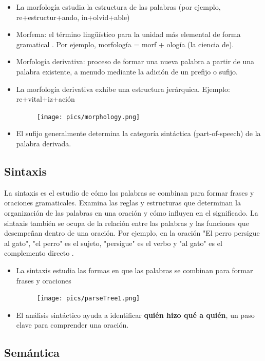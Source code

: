\documentclass{book}
\begin{document}
\begin{itemize}
\item La morfología estudia la estructura de las palabras (por ejemplo, re+estructur+ando, in+olvid+able) \cite{JohnsonMLSS}
\item Morfema: el término lingüístico para la unidad más elemental de forma gramatical \cite{fromkin2018introduction}. Por ejemplo, morfología = morf + ología (la ciencia de).
\item Morfología derivativa: proceso de formar una nueva palabra a partir de una palabra existente, a menudo mediante la adición de un prefijo o sufijo.
\item La morfología derivativa exhibe una estructura jerárquica. Ejemplo: re+vital+iz+ación
\begin{figure}[h]
\texttt{[image: pics/morphology.png]}
\end{figure}
\item El sufijo generalmente determina la categoría sintáctica (part-of-speech) de la palabra derivada.
\end{itemize}

\subsection{Sintaxis}

La sintaxis es el estudio de cómo las palabras se combinan para formar frases y oraciones gramaticales. Examina las reglas y estructuras que determinan la organización de las palabras en una oración y cómo influyen en el significado. La sintaxis también se ocupa de la relación entre las palabras y las funciones que desempeñan dentro de una oración. Por ejemplo, en la oración "El perro persigue al gato", "el perro" es el sujeto, "persigue" es el verbo y "al gato" es el complemento directo \cite{JohnsonMLSS}.

\begin{itemize}
\item La sintaxis estudia las formas en que las palabras se combinan para formar frases y oraciones \cite{JohnsonMLSS}
\begin{figure}[h]
\texttt{[image: pics/parseTree1.png]}
\end{figure}
\item El análisis sintáctico ayuda a identificar \textbf{quién hizo qué a quién}, un paso clave para comprender una oración.
\end{itemize}


\subsection{Semántica}
\end{document}
